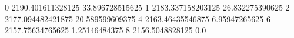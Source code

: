 0 2190.401611328125 33.896728515625
1 2183.337158203125 26.832275390625
2 2177.094482421875 20.589599609375
4 2163.46435546875 6.95947265625
6 2157.75634765625 1.25146484375
8 2156.5048828125 0.0
